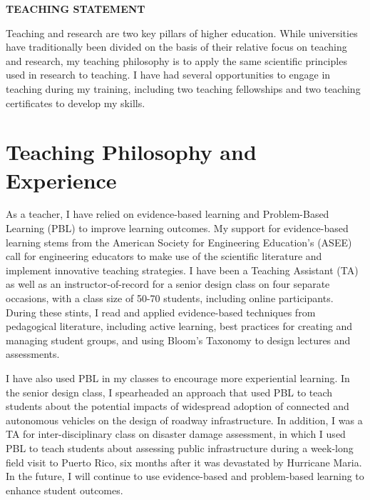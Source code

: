 \documentclass[12pt]{article}
\begin{document}
 \sloppy %
\begin{center}
{\large \uppercase{\textbf{Teaching Statement}}}
\end{center}

Teaching and research are two key pillars of higher education. While universities have traditionally been divided on the basis of their relative focus on teaching and research, my teaching philosophy is to apply the same scientific principles used in research to teaching. I have had several opportunities to engage in teaching during my training, including two teaching fellowships and two teaching certificates to develop my skills. 

\section*{Teaching Philosophy and Experience}
As a teacher, I have relied on evidence-based learning and Problem-Based Learning (PBL) to improve learning outcomes. My support for evidence-based learning stems from the American Society for Engineering Education's (ASEE) call for engineering educators to make use of the scientific literature and implement innovative teaching strategies. I have been a Teaching Assistant (TA) as well as an instructor-of-record for a senior design class on four separate occasions, with a class size of 50-70 students, including online participants. During these stints, I read and applied evidence-based techniques from pedagogical literature, including active learning, best practices for creating and managing student groups, and using Bloom's Taxonomy to design lectures and assessments. 

I have also used PBL in my classes to encourage more experiential learning. In the senior design class, I spearheaded an approach that used PBL to teach students about the potential impacts of widespread adoption of connected and autonomous vehicles on the design of roadway infrastructure. In addition, I was a TA for inter-disciplinary class on disaster damage assessment, in which I used PBL to teach students about assessing public infrastructure during a week-long field visit to Puerto Rico, six months after it was devastated by Hurricane Maria. In the future, I will continue to use evidence-based and problem-based learning to enhance student outcomes.
\end{document}
